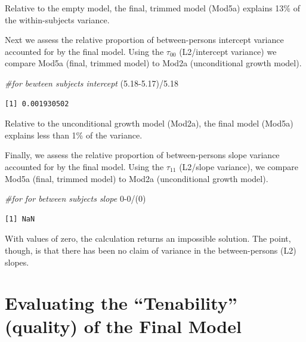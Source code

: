\documentclass[
  english,
]{book}
\newenvironment{Shaded}{\begin{snugshade}}{\end{snugshade}}
\newcommand{\CommentTok}[1]{\textcolor[rgb]{0.56,0.35,0.01}{\textit{#1}}}
\newcommand{\DecValTok}[1]{\textcolor[rgb]{0.00,0.00,0.81}{#1}}
\newcommand{\FloatTok}[1]{\textcolor[rgb]{0.00,0.00,0.81}{#1}}
\newcommand{\NormalTok}[1]{#1}
\newcommand{\SpecialCharTok}[1]{\textcolor[rgb]{0.00,0.00,0.00}{#1}}
\begin{document}
Relative to the empty model, the final, trimmed model (Mod5a) explains 13\% of the within-subjects variance.

Next we assess the relative proportion of between-persons intercept variance accounted for by the final model. Using the \(\tau _{00}\) (L2/intercept variance) we compare Mod5a (final, trimmed model) to Mod2a (unconditional growth model).

\begin{Shaded}
\begin{Highlighting}[]
\CommentTok{\#for bewteen subjects intercept}
\NormalTok{(}\FloatTok{5.18{-}5.17}\NormalTok{)}\SpecialCharTok{/}\FloatTok{5.18}
\end{Highlighting}
\end{Shaded}

\begin{verbatim}
[1] 0.001930502
\end{verbatim}

Relative to the unconditional growth model (Mod2a), the final model (Mod5a) explains less than 1\% of the variance.

Finally, we assess the relative proportion of between-persons slope variance accounted for by the final model. Using the \(\tau _{11}\) (L2/slope variance), we compare Mod5a (final, trimmed model) to Mod2a (unconditional growth model).

\begin{Shaded}
\begin{Highlighting}[]
\CommentTok{\#for for between subjects slope}
\DecValTok{0{-}0}\SpecialCharTok{/}\NormalTok{(}\DecValTok{0}\NormalTok{)}
\end{Highlighting}
\end{Shaded}

\begin{verbatim}
[1] NaN
\end{verbatim}

With values of zero, the calculation returns an impossible solution. The point, though, is that there has been no claim of variance in the between-persons (L2) slopes.

\hypertarget{evaluating-the-tenability-quality-of-the-final-model}{%
\section{Evaluating the ``Tenability'' (quality) of the Final Model}\label{evaluating-the-tenability-quality-of-the-final-model}}
\end{document}
